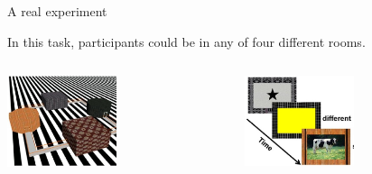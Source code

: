 \documentclass[11pt]{beamer}
\begin{document}
\begin{frame}{A real experiment}

    In this task, participants could be in any of four different
    rooms.

    \begin{columns}
        \begin{column}{0.5\textwidth}
            \begin{center}
                \includegraphics[width=0.5\textwidth]{figures/4_rooms.jpg}
            \end{center}
        \end{column}
        \begin{column}{0.5\textwidth}
            \begin{center}
                \includegraphics[width=0.5\textwidth]{figures/4_rooms_stimuli.jpg}
            \end{center}
        \end{column}
    \end{columns}
\end{frame}
\end{document}

